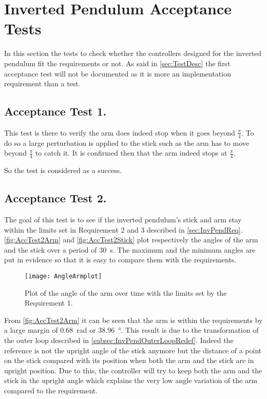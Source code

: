 \graphicspath{{figures/AcceptanceTest/}}

\chapter{Inverted Pendulum Acceptance Tests}\label{sec:InvPendAccTest}

In this section the tests to check whether the controllers designed for the inverted pendulum fit the requirements or not. As said in \autoref{sec:TestDesc} the first acceptance test will not be documented as it is more an implementation requirement than a test.

\section{Acceptance Test 1.}

This test is there to verify the arm does indeed stop when it goes beyond $\frac{\pi}{4}$. To do so a large perturbation is applied to the stick such as the arm has to move beyond $\frac{\pi}{4}$ to catch it. It is confirmed then that the arm indeed stops at $\frac{\pi}{4}$.

So the test is considered as a success.

\section{Acceptance Test 2.}

The goal of this test is to see if the inverted pendulum's stick and arm stay within the limits set in Requirement 2 and 3 described in \autoref{sec:InvPendReq}. \autoref{fig:AccTest2Arm} and \ref{fig:AccTest2Stick} plot respectively the angles of the arm and the stick over a period of \SI{30}{\second}. The maximum and the minimum angles are put in evidence so that it is easy to compare them with the requirements.

\begin{figure} [htbp]
	\centering
	\texttt{[image: AngleArmplot]}
	\caption{Plot of the angle of the arm over time with the limits set by the Requirement 1.}
	\label{fig:AccTest2Arm}
\end{figure}

From \autoref{fig:AccTest2Arm} it can be seen that the arm is within the requirements by a large margin of \SI{0.68}{\radian} or \SI{38.96}{\degree}. This result is due to the transformation of the outer loop described in \autoref{subsec:InvPendOuterLoopRedef}. Indeed the reference is not the upright angle of the stick anymore but the distance of a point on the stick compared with its position when both the arm and the stick are in upright position. Due to this, the controller will try to keep both the arm and the stick in the upright angle which explains the very low angle variation of the arm compared to the requirement.

